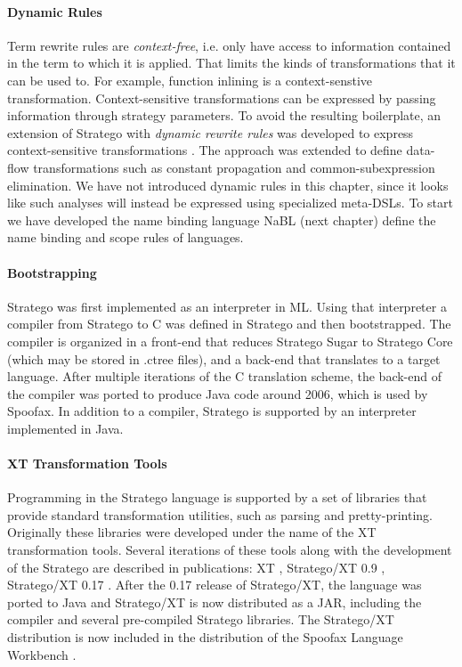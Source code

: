 \paragraph{Dynamic Rules}

Term rewrite rules are \emph{context-free}, i.e. only have access to information
contained in the term to which it is applied. That limits the kinds of
transformations that it can be used to. For example, function inlining is a
context-senstive transformation. Context-sensitive transformations can be
expressed by passing information through strategy parameters. To avoid the
resulting boilerplate, an extension of Stratego with \emph{dynamic rewrite
rules} was developed to express context-sensitive transformations
\cite{BravenboerDOV06}. The approach was extended to define data-flow
transformations such as constant propagation and common-subexpression
elimination. We have not introduced dynamic rules in this chapter, since it
looks like such analyses will instead be expressed using specialized meta-DSLs.
To start we have developed the name binding language NaBL (next chapter) define
the name binding and scope rules of languages.

\paragraph{Bootstrapping}

Stratego was first implemented as an interpreter in ML. Using that interpreter a
compiler from Stratego to C was defined in Stratego and then bootstrapped. 
The compiler is organized in a front-end that reduces Stratego Sugar to Stratego
Core (which may be stored in .ctree files), and a back-end that translates
to a target language. After multiple iterations of the C translation scheme, the
back-end of the compiler was ported to produce Java code around 2006, which is
used by Spoofax. In addition to a compiler, Stratego is supported by an
interpreter implemented in Java.

\paragraph{XT Transformation Tools}

Programming in the Stratego language is supported by a set of libraries that
provide standard transformation utilities, such as parsing and pretty-printing.
Originally these libraries were developed under the name of the XT
transformation tools. Several iterations of these tools along with the
development of the Stratego are described in publications: XT \cite{JongeVV01},
Stratego/XT 0.9 \cite{Visser03}, Stratego/XT 0.17 \cite{BravenboerKVV08}. 
After the 0.17 release of Stratego/XT, the language was ported to Java and
Stratego/XT is now distributed as a JAR, including the compiler and several
pre-compiled Stratego libraries.
The Stratego/XT distribution is now included in the distribution of the Spoofax
Language Workbench \cite{KatsV10}.

